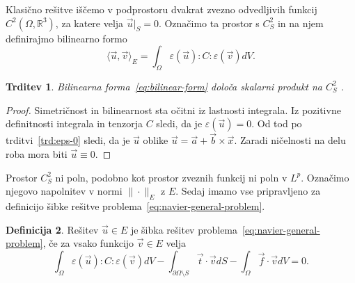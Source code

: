 \documentclass[12pt,a4paper,twoside]{article}
\theoremstyle{definition} %
\newtheorem{definicija}{Definicija}[section]
\theoremstyle{plain} %
\newtheorem{trditev}[definicija]{Trditev}
\numberwithin{equation}{section}
\newcommand{\R}{\mathbb R}
\newcommand{\eps}{\varepsilon}
\newcommand{\vv}{\vec{v}}
\newcommand{\vt}{\vec{t}}
\newcommand{\vu}{\vec{u}}
\newcommand{\va}{\vec{a}}
\newcommand{\vb}{\vec{b}}
\newcommand{\vf}{\vec{f}}
\newcommand{\vx}{\vec{x}}
\begin{document}
Klasično rešitve iščemo v podprostoru dvakrat zvezno odvedljivih funkcij
$C^2(\Omega, \R^3)$, za katere velja $\vu|_S = 0$. Označimo ta prostor s $C^2_S$
in na njem definirajmo bilinearno formo
\begin{equation}
   \langle \vu, \vv \rangle_E =  \int_{\Omega} \eps(\vu) : C : \eps(\vv) dV.
   \label{eq:bilinear-form}
\end{equation}
\begin{trditev}
  Bilinearna forma~\eqref{eq:bilinear-form} določa skalarni produkt na $C^2_S$ .
\end{trditev}
\begin{proof}
Simetričnost in bilinearnost sta očitni iz lastnosti integrala. Iz pozitivne
definitnosti integrala in tenzorja $C$ sledi, da je $\eps(\vu) = 0$. Od tod po
trditvi~\ref{trd:eps-0} sledi, da je $\vu$ oblike $\vu = \va + \vb \times \vx$.
Zaradi ničelnosti na delu roba mora biti $\vu \equiv 0$.
\end{proof}
Prostor $C^2_S$ ni poln, podobno kot prostor zveznih funkcij ni poln v $L^p$.
Označimo njegovo napolnitev v normi $\|\cdot\|_E$ z $E$. Sedaj imamo vse
pripravljeno za definicijo šibke rešitve problema~\ref{eq:navier-general-problem}.
\begin{definicija}
  \label{def:sibka}
  Rešitev $\vu \in E$ je šibka rešitev problema~\ref{eq:navier-general-problem},
  če za vsako funkcijo $\vv \in E$ velja
  \begin{equation}
    \int_{\Omega}\eps(\vu) : C : \eps(\vv) dV - \int_{\partial \Omega\setminus S} \vt\cdot \vv dS
    -\int_{\Omega} \vf\cdot \vv dV = 0.
  \end{equation}
\end{definicija}
\end{document}
